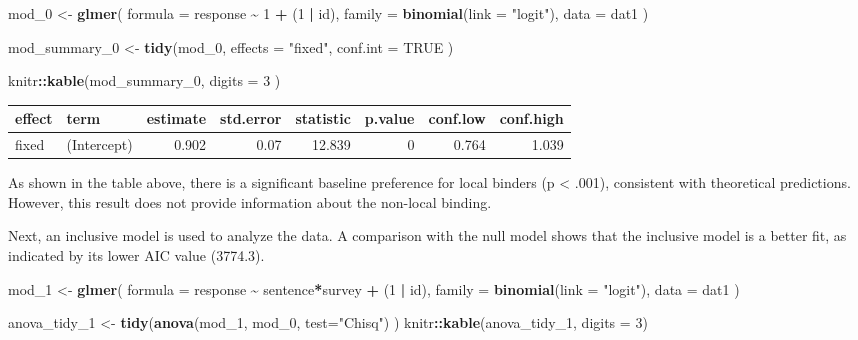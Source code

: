 \documentclass[
  man]{apa6}
\newenvironment{Shaded}{\begin{snugshade}}{\end{snugshade}}
\newcommand{\AttributeTok}[1]{\textcolor[rgb]{0.13,0.29,0.53}{#1}}
\newcommand{\ConstantTok}[1]{\textcolor[rgb]{0.56,0.35,0.01}{#1}}
\newcommand{\DecValTok}[1]{\textcolor[rgb]{0.00,0.00,0.81}{#1}}
\newcommand{\FunctionTok}[1]{\textcolor[rgb]{0.13,0.29,0.53}{\textbf{#1}}}
\newcommand{\NormalTok}[1]{#1}
\newcommand{\OtherTok}[1]{\textcolor[rgb]{0.56,0.35,0.01}{#1}}
\newcommand{\SpecialCharTok}[1]{\textcolor[rgb]{0.81,0.36,0.00}{\textbf{#1}}}
\newcommand{\StringTok}[1]{\textcolor[rgb]{0.31,0.60,0.02}{#1}}
\begin{document}
\begin{Shaded}
\begin{Highlighting}[]
\NormalTok{mod\_0 }\OtherTok{\textless{}{-}} \FunctionTok{glmer}\NormalTok{(}
  \AttributeTok{formula =}\NormalTok{ response }\SpecialCharTok{\textasciitilde{}} \DecValTok{1} \SpecialCharTok{+}\NormalTok{ (}\DecValTok{1} \SpecialCharTok{|}\NormalTok{ id),}
  \AttributeTok{family =} \FunctionTok{binomial}\NormalTok{(}\AttributeTok{link =} \StringTok{"logit"}\NormalTok{),}
  \AttributeTok{data =}\NormalTok{ dat1}
\NormalTok{  )}

\NormalTok{mod\_summary\_0 }\OtherTok{\textless{}{-}} \FunctionTok{tidy}\NormalTok{(mod\_0, }
                      \AttributeTok{effects =} \StringTok{"fixed"}\NormalTok{,}
                      \AttributeTok{conf.int =} \ConstantTok{TRUE}
\NormalTok{                      )}

\NormalTok{  knitr}\SpecialCharTok{::}\FunctionTok{kable}\NormalTok{(mod\_summary\_0, }\AttributeTok{digits =} \DecValTok{3}\NormalTok{ )}
\end{Highlighting}
\end{Shaded}

\begin{tabular}{l|l|r|r|r|r|r|r}
\hline
effect & term & estimate & std.error & statistic & p.value & conf.low & conf.high\\
\hline
fixed & (Intercept) & 0.902 & 0.07 & 12.839 & 0 & 0.764 & 1.039\\
\hline
\end{tabular}

As shown in the table above, there is a significant baseline preference for local binders (p \textless{} .001), consistent with theoretical predictions. However, this result does not provide information about the non-local binding.

Next, an inclusive model is used to analyze the data. A comparison with the null model shows that the inclusive model is a better fit, as indicated by its lower AIC value (3774.3).

\begin{Shaded}
\begin{Highlighting}[]
\NormalTok{mod\_1 }\OtherTok{\textless{}{-}} \FunctionTok{glmer}\NormalTok{(}
  \AttributeTok{formula =}\NormalTok{ response }\SpecialCharTok{\textasciitilde{}}\NormalTok{ sentence}\SpecialCharTok{*}\NormalTok{survey }\SpecialCharTok{+}\NormalTok{ (}\DecValTok{1} \SpecialCharTok{|}\NormalTok{ id),}
  \AttributeTok{family =} \FunctionTok{binomial}\NormalTok{(}\AttributeTok{link =} \StringTok{"logit"}\NormalTok{),}
  \AttributeTok{data =}\NormalTok{ dat1}
\NormalTok{  )}

\NormalTok{anova\_tidy\_1 }\OtherTok{\textless{}{-}} \FunctionTok{tidy}\NormalTok{(}\FunctionTok{anova}\NormalTok{(mod\_1, mod\_0, }
                         \AttributeTok{test=}\StringTok{"Chisq"}\NormalTok{)}
\NormalTok{                   )}
\NormalTok{knitr}\SpecialCharTok{::}\FunctionTok{kable}\NormalTok{(anova\_tidy\_1, }\AttributeTok{digits =} \DecValTok{3}\NormalTok{)}
\end{Highlighting}
\end{Shaded}
\end{document}
